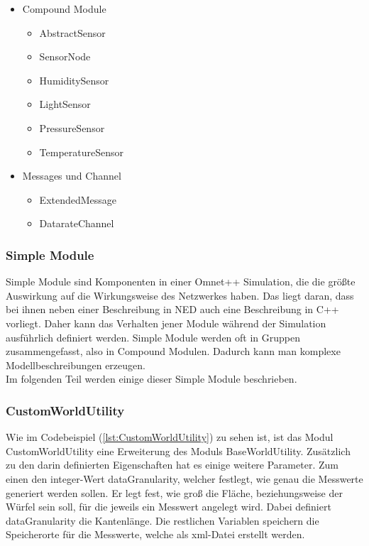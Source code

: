 \begin{minipage}{\textwidth}
\begin{itemize}{\label{enum:NedModules}}
\begin{multicols}{2}
\begin{itemize}
\item TransducerPressure
\item TransducerTemperature 
\end{itemize}
\end{multicols}
\item Compound Module
\begin{multicols}{2}
\begin{itemize}
\item AbstractSensor
\item SensorNode
\item HumiditySensor
\item LightSensor
\item PressureSensor
\item TemperatureSensor 
\end{itemize}
\end{multicols}
\item Messages und Channel
\begin{multicols}{2}
\begin{itemize}
\item ExtendedMessage
\item DatarateChannel
\end{itemize}
\end{multicols}
\end{itemize}
\end{minipage}

\subsubsection{Simple Module}

Simple Module sind Komponenten in einer Omnet++ Simulation, die die größte Auswirkung auf die Wirkungsweise des Netzwerkes haben. Das liegt daran, dass bei ihnen neben einer Beschreibung in NED auch eine Beschreibung in C++ vorliegt. Daher kann das Verhalten jener Module während der Simulation ausführlich definiert werden. Simple Module werden oft in Gruppen zusammengefasst, also in Compound Modulen. Dadurch kann man komplexe Modellbeschreibungen erzeugen.\\
Im folgenden Teil werden einige dieser Simple Module beschrieben.

\subsubsection{CustomWorldUtility}

Wie im Codebeispiel (\ref{lst:CustomWorldUtility}) zu sehen ist, ist das Modul CustomWorldUtility eine Erweiterung des Moduls BaseWorldUtility. Zusätzlich zu den darin definierten Eigenschaften hat es einige weitere Parameter. Zum einen den integer-Wert dataGranularity, welcher festlegt, wie genau die Messwerte generiert werden sollen. Er legt fest, wie groß die Fläche, beziehungsweise  der Würfel sein soll, für die jeweils ein Messwert angelegt wird. Dabei definiert dataGranularity die Kantenlänge. Die restlichen Variablen speichern die Speicherorte für die Messwerte, welche als xml-Datei erstellt werden.

